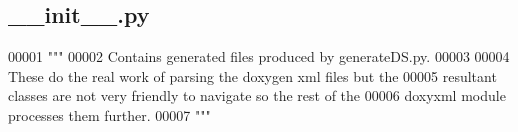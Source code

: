 \subsection{\+\_\+\+\_\+init\+\_\+\+\_\+.\+py}
\label{docs_2doxygen_2doxyxml_2generated_2____init_____8py_source}

\begin{DoxyCode}
00001 \textcolor{stringliteral}{"""}
00002 \textcolor{stringliteral}{Contains generated files produced by generateDS.py.}
00003 \textcolor{stringliteral}{}
00004 \textcolor{stringliteral}{These do the real work of parsing the doxygen xml files but the}
00005 \textcolor{stringliteral}{resultant classes are not very friendly to navigate so the rest of the}
00006 \textcolor{stringliteral}{doxyxml module processes them further.}
00007 \textcolor{stringliteral}{"""}
\end{DoxyCode}

